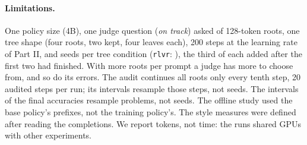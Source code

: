 \paragraph{Limitations.} One policy size (4B), one judge question (\emph{on track}) asked of 128-token roots, one tree
shape (four roots, two kept, four leaves each), 200 steps at the learning rate of Part II, and 
seeds per tree condition (\texttt{rlvr}: ), the third of each added after the first two had finished.
With more roots per prompt a judge has more to choose from, and so do its errors. The audit continues all roots only
every tenth step, 20 audited steps per run; its intervals resample those steps, not seeds. The intervals of the final
accuracies resample problems, not seeds. The offline study used the base policy's prefixes, not the training policy's.
The style measures were defined after reading the completions. We report tokens, not time: the runs shared GPUs with
other experiments.
